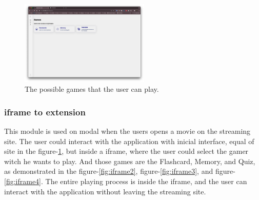 \documentclass[12pt]{article}
\begin{document}
    \begin{figure}[!h]
      \centering
      \caption{
      The possible games that the user can play.
      }
      \label{fig:site5}
      \includegraphics[width=0.55\textwidth]{assets/5.png}
    \end{figure}





\newpage
\subsubsection{iframe to extension}
      This module is used on modal when the users opens a movie on the streaming site. The user could interact with the application with 
      inicial interface, equal of site in the figure-\ref{fig:site5}, but inside a iframe, where the user could select the gamer witch he wants to play. 
      And those games are the Flashcard, Memory, and Quiz, as demonstrated in the figure-\ref{fig:iframe2}, figure-\ref{fig:iframe3}, and figure-\ref{fig:iframe4}.
      The entire playing process is inside the iframe, and the user can interact with the application without leaving the streaming site.
      
      
\end{document}
